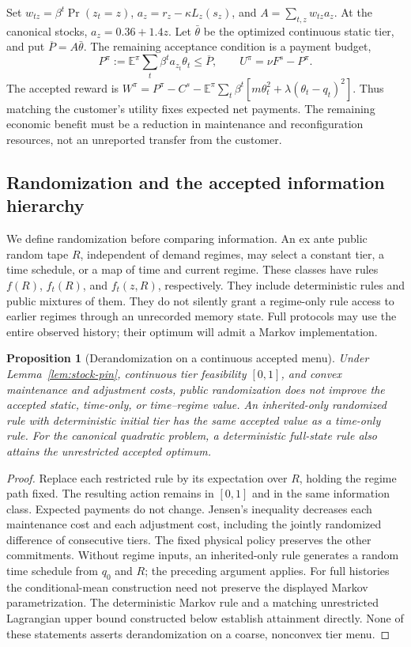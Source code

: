 \documentclass[11pt,letterpaper]{article}
\newtheorem{proposition}[theorem]{Proposition}
\theoremstyle{definition}
\newcommand{\E}{\mathbb E}
\newcommand{\1}{\mathbf 1}
\begin{document}
Set $w_{tz}=\beta^t\Pr(z_t=z)$, $a_z=r_z-\kappa L_z(s_z)$, and $A=\sum_{t,z}w_{tz}a_z$. At the canonical stocks, $a_z=0.36+1.4z$. Let $\bar\theta$ be the optimized continuous static tier, and put $\overline P=A\bar\theta$. The remaining acceptance condition is a payment budget,
\begin{equation}\label{eq:accepted-payment}
 P^\pi:=\E^\pi\sum_t\beta^t a_{z_t}\theta_t\leq\overline P,
 \qquad U^\pi=\nu F^s-P^\pi.
\end{equation}
The accepted reward is $W^\pi=P^\pi-C^s-\E^\pi\sum_t\beta^t[m\theta_t^2+\lambda(\theta_t-q_t)^2]$. Thus matching the customer's utility fixes expected net payments. The remaining economic benefit must be a reduction in maintenance and reconfiguration resources, not an unreported transfer from the customer.

\subsection{Randomization and the accepted information hierarchy}
We define randomization before comparing information. An ex ante public random tape $R$, independent of demand regimes, may select a constant tier, a time schedule, or a map of time and current regime. These classes have rules $f(R)$, $f_t(R)$, and $f_t(z,R)$, respectively. They include deterministic rules and public mixtures of them. They do not silently grant a regime-only rule access to earlier regimes through an unrecorded memory state. Full protocols may use the entire observed history; their optimum will admit a Markov implementation.

\begin{proposition}[Derandomization on a continuous accepted menu]\label{prop:accepted-jensen}
Under Lemma~\ref{lem:stock-pin}, continuous tier feasibility $[0,1]$, and convex maintenance and adjustment costs, public randomization does not improve the accepted static, time-only, or time--regime value. An inherited-only randomized rule with deterministic initial tier has the same accepted value as a time-only rule. For the canonical quadratic problem, a deterministic full-state rule also attains the unrestricted accepted optimum.
\end{proposition}
\begin{proof}
Replace each restricted rule by its expectation over $R$, holding the regime path fixed. The resulting action remains in $[0,1]$ and in the same information class. Expected payments do not change. Jensen's inequality decreases each maintenance cost and each adjustment cost, including the jointly randomized difference of consecutive tiers. The fixed physical policy preserves the other commitments. Without regime inputs, an inherited-only rule generates a random time schedule from $q_0$ and $R$; the preceding argument applies. For full histories the conditional-mean construction need not preserve the displayed Markov parametrization. The deterministic Markov rule and a matching unrestricted Lagrangian upper bound constructed below establish attainment directly. None of these statements asserts derandomization on a coarse, nonconvex tier menu.
\end{proof}
\end{document}
